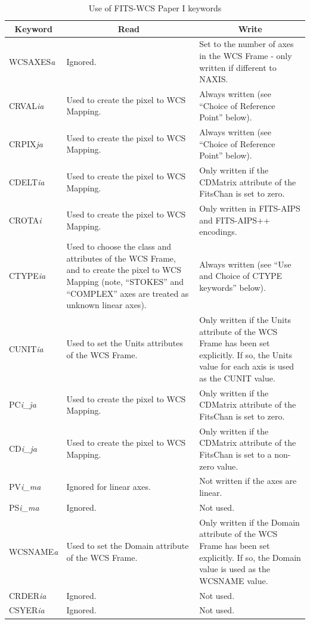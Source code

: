 \documentclass[twoside,11pt]{starlink}
\providecommand{\fitskey}[3]{{#1}&{#2}&{#3}\\}
\begin{document}
\begin{table}[htbp]
\begin{tabular}{|l|p{2.5in}|p{2.5in}|}
\hline
\multicolumn{1}{|c|}{\textbf{Keyword}} & \multicolumn{1}{c|}{\textbf{Read}}
& \multicolumn{1}{c|}{\textbf{Write}} \\ \hline

\fitskey{WCSAXES\emph{a}}{Ignored.}{Set to the number of axes in the WCS
Frame - only written if different to NAXIS.}

\fitskey{CRVAL\emph{ia}}{Used to create the pixel to WCS
Mapping.}{Always written (see ``Choice of Reference
Point'' below).}

\fitskey{CRPIX\emph{ja}}{Used to create the pixel to WCS Mapping.}{Always
written (see ``Choice of Reference Point'' below).}

\fitskey{CDELT\emph{ia}}{Used to create the pixel to WCS Mapping.}{Only
written if the CDMatrix attribute of the FitsChan is
set to zero.}

\fitskey{CROTA\emph{i}}{Used to create the pixel to WCS Mapping.}{Only
written in FITS-AIPS and FITS-AIPS++ encodings.}

\fitskey{CTYPE\emph{ia}}{Used to choose the class and attributes of the
WCS Frame, and to create the pixel to WCS Mapping (note, ``STOKES'' and
``COMPLEX'' axes are treated as unknown linear axes).}{Always written
(see ``Use and Choice of CTYPE keywords'' below).}

\fitskey{CUNIT\emph{ia}}{Used to set the Units attributes
of the WCS Frame.}{Only written if the Units attribute of the WCS Frame
has been set explicitly. If so, the Units value for each axis is used as
the CUNIT value.}

\fitskey{PC\emph{i\_j}\emph{a}}{Used to create the pixel to WCS
Mapping.}{Only written if the CDMatrix attribute of the FitsChan is set to
zero.}

\fitskey{CD\emph{i\_j}\emph{a}}{Used to create the pixel to WCS
Mapping.}{Only written if the CDMatrix attribute of the FitsChan is set to
a non-zero value.}

\fitskey{PV\emph{i\_ma}}{Ignored for linear axes.}{Not written if the axes
are linear.}

\fitskey{PS\emph{i\_ma}}{Ignored.}{Not used.}

\fitskey{WCSNAME\emph{a}}{Used to set the Domain attribute
of the WCS Frame.}{Only written if the Domain attribute of the WCS Frame
has been set explicitly. If so, the Domain value is used as the WCSNAME
value.}

\fitskey{CRDER\emph{ia}}{Ignored.}{Not used.}

\fitskey{CSYER\emph{ia}}{Ignored.}{Not used.}

\hline
\end{tabular}
\vspace{3.mm}
\caption{Use of FITS-WCS Paper I keywords}
\label{tab:fitspaper1}
\end{table}
\end{document}
